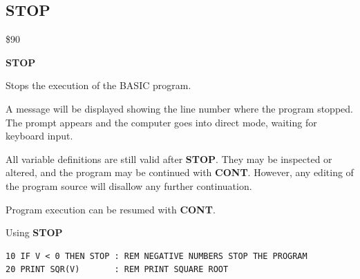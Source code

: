 \newpage
\subsection{STOP}
\begin{description}[leftmargin=2cm,style=nextline]
\item [Token:]    \$90

\item [Format:]   {\bf STOP}

\item [Usage:]    Stops the execution of the BASIC program.

                  A message will be displayed showing the line number where the program stopped. The  prompt appears and the computer goes into direct mode, waiting for keyboard input.

\item [Remarks:]  All variable definitions are still valid after {\bf STOP}. They may be inspected or altered, and the program may be continued with {\bf CONT}. However, any editing of the program source will disallow any further continuation.

                  Program execution can be resumed with {\bf CONT}.

\item [Example:]  Using {\bf STOP}

\begin{tcolorbox}[colback=black,coltext=white]
\verbatimfont{\codefont}
\begin{verbatim}
10 IF V < 0 THEN STOP : REM NEGATIVE NUMBERS STOP THE PROGRAM
20 PRINT SQR(V)       : REM PRINT SQUARE ROOT
\end{verbatim}
\end{tcolorbox}
\end{description}


\newpage
